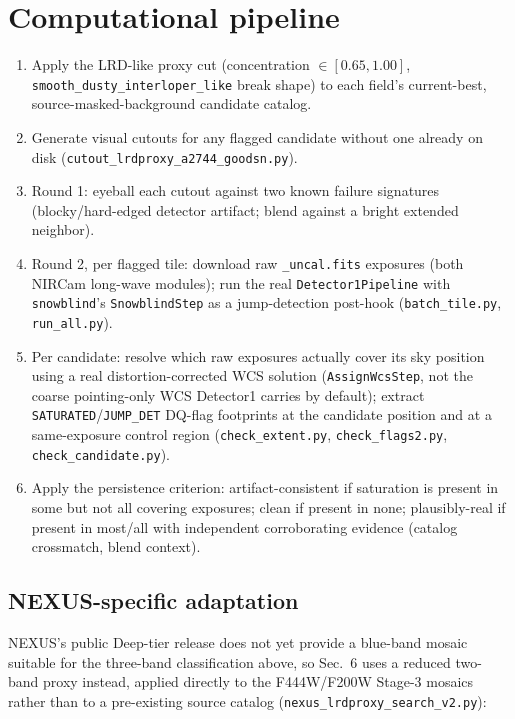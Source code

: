 \documentclass[11pt]{article}
\begin{document}
\appendix
\section{Computational pipeline} \label{sec:appendix}

\begin{enumerate}
    \item Apply the LRD-like proxy cut (concentration $\in[0.65,1.00]$,
    \texttt{smooth\_dusty\_interloper\_like} break shape) to each field's
    current-best, source-masked-background candidate catalog.
    \item Generate visual cutouts for any flagged candidate without one already
    on disk (\texttt{cutout\_lrdproxy\_a2744\_goodsn.py}).
    \item Round 1: eyeball each cutout against two known failure signatures
    (blocky/hard-edged detector artifact; blend against a bright extended
    neighbor).
    \item Round 2, per flagged tile: download raw \texttt{\_uncal.fits} exposures
    (both NIRCam long-wave modules); run the real \texttt{Detector1Pipeline} with
    \texttt{snowblind}'s \texttt{SnowblindStep} as a jump-detection post-hook
    (\texttt{batch\_tile.py}, \texttt{run\_all.py}).
    \item Per candidate: resolve which raw exposures actually cover its sky
    position using a real distortion-corrected WCS solution
    (\texttt{AssignWcsStep}, not the coarse pointing-only WCS Detector1 carries
    by default); extract \texttt{SATURATED}/\texttt{JUMP\_DET} DQ-flag footprints
    at the candidate position and at a same-exposure control region
    (\texttt{check\_extent.py}, \texttt{check\_flags2.py}, \texttt{
    check\_candidate.py}).
    \item Apply the persistence criterion: artifact-consistent if saturation is
    present in some but not all covering exposures; clean if present in none;
    plausibly-real if present in most/all with independent corroborating evidence
    (catalog crossmatch, blend context).
\end{enumerate}

\subsection{NEXUS-specific adaptation}

NEXUS's public Deep-tier release does not yet provide a blue-band mosaic
suitable for the three-band classification above, so Sec.~6 uses a reduced
two-band proxy instead, applied directly to the F444W/F200W Stage-3 mosaics
rather than to a pre-existing source catalog (\texttt{nexus\_lrdproxy\_search\_v2.py}):
\end{document}
